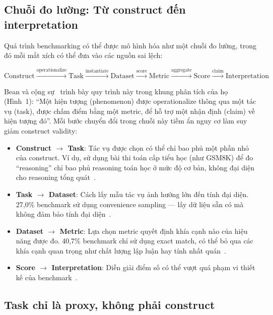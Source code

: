 \subsection{Chuỗi đo lường: Từ construct đến interpretation}
\label{sec:measurement_chain}

Quá trình benchmarking có thể được mô hình hóa như một chuỗi đo lường, trong đó mỗi mắt xích có thể đưa vào các nguồn sai lệch:

\begin{equation}
\text{Construct} \xrightarrow{\text{operationalize}} \text{Task} \xrightarrow{\text{instantiate}} \text{Dataset} \xrightarrow{\text{score}} \text{Metric} \xrightarrow{\text{aggregate}} \text{Score} \xrightarrow{\text{claim}} \text{Interpretation}
\label{eq:measurement_chain}
\end{equation}

Bean và cộng sự~\cite{measuring_what_matters} trình bày quy trình này trong khung phân tích của họ (Hình~1): ``Một hiện tượng (phenomenon) được operationalize thông qua một tác vụ (task), được chấm điểm bằng một metric, để hỗ trợ một nhận định (claim) về hiện tượng đó''. Mỗi bước chuyển đổi trong chuỗi này tiềm ẩn nguy cơ làm suy giảm construct validity:

\begin{itemize}
    \item \textbf{Construct $\rightarrow$ Task}: Tác vụ được chọn có thể chỉ bao phủ một phần nhỏ của construct. Ví dụ, sử dụng bài thi toán cấp tiểu học (như GSM8K) để đo ``reasoning'' chỉ bao phủ reasoning toán học ở mức độ cơ bản, không đại diện cho reasoning tổng quát~\cite{measuring_what_matters}.
    \item \textbf{Task $\rightarrow$ Dataset}: Cách lấy mẫu tác vụ ảnh hưởng lớn đến tính đại diện. 27,0\% benchmark sử dụng convenience sampling --- lấy dữ liệu sẵn có mà không đảm bảo tính đại diện~\cite{measuring_what_matters}.
    \item \textbf{Dataset $\rightarrow$ Metric}: Lựa chọn metric quyết định khía cạnh nào của hiệu năng được đo. 40,7\% benchmark chỉ sử dụng exact match, có thể bỏ qua các khía cạnh quan trọng như chất lượng lập luận hay tính nhất quán~\cite{measuring_what_matters}.
    \item \textbf{Score $\rightarrow$ Interpretation}: Diễn giải điểm số có thể vượt quá phạm vi thiết kế của benchmark~\cite{everything_benchmark, measuring_what_matters}.
\end{itemize}

\subsection{Task chỉ là proxy, không phải construct}
\label{sec:task_as_proxy}

